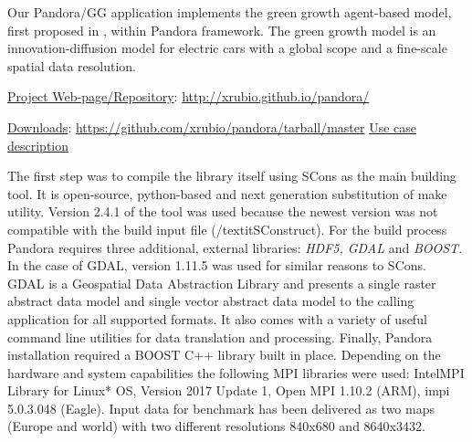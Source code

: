 Our Pandora/GG application implements the green growth agent-based model, first proposed in \cite{2017:gg_pilot}, within \textsf{Pandora} framework.
The green growth model is an innovation-diffusion model for electric cars with a global scope and a fine-scale spatial data resolution.

\iffalse
There are two implementations of his model: deterministic and a stochastic whose implementation for benchmarking purposes was used \cite{2018:abm4py}.
In this preliminary version of the green growth pilot, authors consider only two classes of cars: "green" cars, which for now correspond to battery electric vehicles due to data availability, and "brown" ones. Cars are distributed on a gridded global map, that is, in the first instance "agents" are simply cells in the grid, which automatically specifies a neighbourhood network between them, and their characteristics are a number of brown and one of green cars. Each cell at each time step computes the number of new cars to be added from the total numbers exogenous given and a percentage of cars being scrapped.
\fi

\underline{Project Web-page/Repository}: \url{http://xrubio.github.io/pandora/}

\underline{Downloads}: \url{https://github.com/xrubio/pandora/tarball/master}
\iffalse
\underline{Use case description}

The first step was to compile the library itself using SCons \cite{SCONS} as the main building tool.  It is open-source, python-based and next generation substitution of make utility. Version 2.4.1 of the tool  was used because the newest version was not compatible with the build input file (/textit{SConstruct}). For the build process Pandora \cite{2014:pandora} requires three additional, external libraries: \textit{HDF5, GDAL} and \textit{BOOST}. In the case of GDAL, version 1.11.5 was used for similar reasons to SCons. GDAL is a Geospatial Data Abstraction Library and presents a single raster abstract data model and single vector abstract data model to the calling application for all supported formats. It also comes with a variety of useful command line utilities for data translation and processing. Finally, Pandora installation required a BOOST C++ library built in place.
Depending on the hardware and system capabilities the following MPI libraries were used: Intel\textregistered MPI Library for Linux* OS, Version 2017 Update 1, Open MPI 1.10.2 (ARM), impi 5.0.3.048 (Eagle).
Input data for benchmark has been delivered as two maps (Europe and world) with two different resolutions 840x680 and 8640x3432. 

